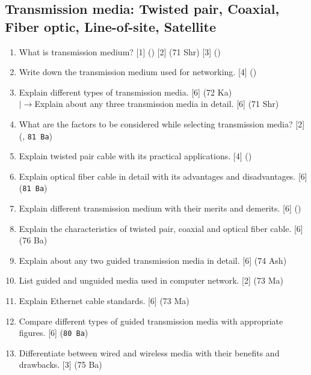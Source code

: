 \documentclass[12pt]{article}
\newcommand{\lb}{\\$\left|\rightarrow\right.$}
\begin{document}
\subsection{Transmission media: Twisted pair, Coaxial, Fiber optic, Line-of-site, Satellite}
\begin{enumerate}[noitemsep, topsep=0pt]
	\item What is transmission medium?  \hfill [1] () [2] (71 Shr) [3] ()
	
	\item Write down the transmission medium used for networking. \hfill [4] ()
	
	\item Explain different types of transmission media. \hfill [6] (72 Ka)
	\lb Explain about any three transmission media in detail. \hfill [6] (71 Shr)
	
	\item What are the factors to be considered while selecting transmission media? \hfill [2] (, \texttt{81 Ba})

	\item Explain twisted pair cable with its practical applications. \hfill [4] ()	
	
	\item Explain optical fiber cable in detail with its advantages and disadvantages. \hfill [6] (\texttt{81 Ba})
	
	\item Explain different transmission medium with their merits and demerits. \hfill [6] ()
	
	\item Explain the characteristics of twisted pair, coaxial and optical fiber cable. \hfill [6] (76 Ba)
	
	\item Explain about any two guided transmission media in detail. \hfill [6] (74 Ash)	
	
	\item List guided and unguided media used in computer network. \hfill [2] (73 Ma)
	
	\item Explain Ethernet cable standards. \hfill [6] (73 Ma)
	
	\item Compare different types of guided transmission media with appropriate figures. \hfill [6] (\texttt{80 Ba})
	
	\item Differentiate between wired and wireless media with their benefits and drawbacks. \hfill [3] (75 Ba)
	

\end{enumerate}
\end{document}
